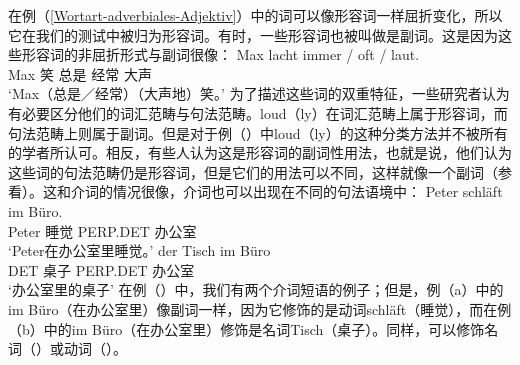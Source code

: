 在例（\ref{Wortart-adverbiales-Adjektiv}）中的词可以像形容词一样屈折变化，所以它在我们的测试中被归为形容词。有时，一些形容词也被叫做是副词。这是因为这些形容词的非屈折形式与副词很像：
\ea
\gll Max lacht immer / oft / laut.\\
	 Max 笑 总是 {} 经常 {} 大声\\
\glt `Max（总是／经常）（大声地）笑。'
\z
%
为了描述这些词的双重特征，一些研究者认为有必要区分他们的词汇范畴与句法范畴。loud（ly）在词汇范畴上属于形容词，而句法范畴上则属于副词。但是对于例（）中loud（ly）的这种分类方法并不被所有的学者所认可。相反，有些人认为这是形容词的副词性用法，也就是说，他们认为这些词的句法范畴仍是形容词，但是它们的用法可以不同，这样就像一个副词（参看\citealp[Section~7.3]{Eisenberg2004a}）。这和介词的情况很像，介词也可以出现在不同的句法语境中：
\eal
\ex 
\gll Peter schläft im Büro.\\
     Peter 睡觉 PERP.DET 办公室\\
\glt `Peter在办公室里睡觉。'
\ex 
\gll der Tisch im Büro\\
     DET 桌子 PERP.DET 办公室\\
\glt `办公室里的桌子'
\zl
在例（）中，我们有两个介词短语的例子；但是，例（a）中的im Büro（在办公室里）像副词一样，因为它修饰的是动词schläft（睡觉），而在例（b）中的im Büro（在办公室里）修饰是名词Tisch（桌子）。同样，可以修饰名词（）或动词（）。
